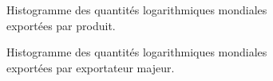 		\begin{figure}[H]
		\begin{subfigure}{.5\textwidth}
				\centering
				\caption{Histogramme des quantités logarithmiques mondiales exportées par produit.}
				\label{fig:colprod}
		\end{subfigure}
		\begin{subfigure}{.5\textwidth}
				\centering
				\caption{Histogramme des quantités logarithmiques mondiales exportées par exportateur majeur.}
				\label{fig:colexp}
		\end{subfigure}
				\begin{subfigure}{.5\textwidth}
						\centering

\end{subfigure}
\end{figure}
